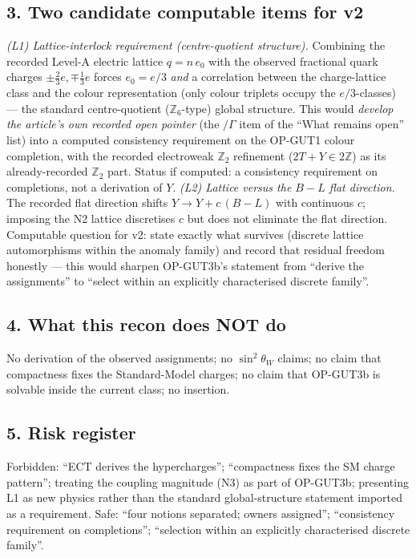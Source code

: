 \subsection*{3. Two candidate computable items for v2}
\emph{(L1) Lattice-interlock requirement (centre-quotient
structure).}
Combining the recorded Level-A electric lattice $q=n\,e_0$ with
the observed fractional quark charges $\pm\tfrac23 e,\mp\tfrac13e$
forces $e_0=e/3$ \emph{and} a correlation between the
charge-lattice class and the colour representation (only colour
triplets occupy the $e/3$-classes) --- the standard
centre-quotient ($\mathbb Z_6$-type) global structure.
This would \emph{develop the article's own recorded open
pointer} (the $/\Gamma$ item of the ``What remains open'' list)
into a computed consistency requirement on the OP-GUT1 colour
completion, with the recorded electroweak $\mathbb Z_2$
refinement ($2T+Y\in2\mathbb Z$) as its already-recorded
$\mathbb Z_2$ part.
Status if computed: a consistency requirement on completions, not
a derivation of $Y$.
\emph{(L2) Lattice versus the $B{-}L$ flat direction.}
The recorded flat direction shifts $Y\to Y+c\,(B{-}L)$ with
continuous $c$; imposing the N2 lattice discretises $c$ but does
not eliminate the flat direction.
Computable question for v2: state exactly what survives
(discrete lattice automorphisms within the anomaly family) and
record that residual freedom honestly --- this would sharpen
OP-GUT3b's statement from ``derive the assignments'' to ``select
within an explicitly characterised discrete family''.

\subsection*{4. What this recon does NOT do}
No derivation of the observed assignments; no $\sin^2\theta_W$
claims; no claim that compactness fixes the Standard-Model
charges; no claim that OP-GUT3b is solvable inside the current
class; no insertion.

\subsection*{5. Risk register}
Forbidden: ``ECT derives the hypercharges''; ``compactness fixes
the SM charge pattern''; treating the coupling magnitude (N3) as
part of OP-GUT3b; presenting L1 as new physics rather than the
standard global-structure statement imported as a requirement.
Safe: ``four notions separated; owners assigned'';
``consistency requirement on completions'';
``selection within an explicitly characterised discrete family''.

